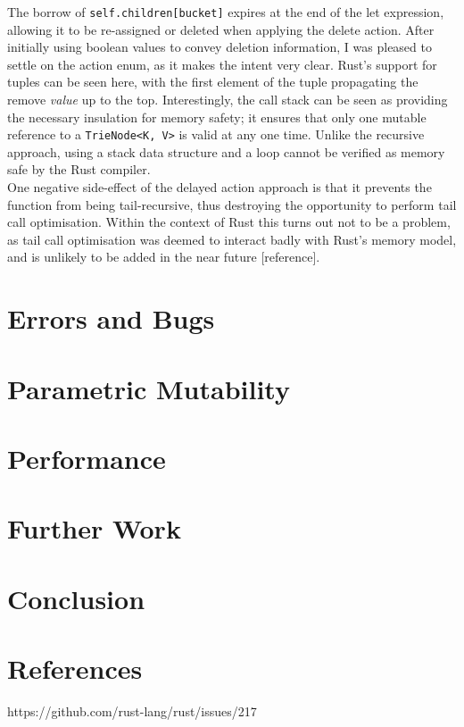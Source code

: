 \documentclass[a4paper,12pt]{article}
\newcommand{\code}{\texttt}
\begin{document}
The borrow of \code{self.children[bucket]} expires at the end of the let expression, allowing it to be re-assigned or deleted when applying the delete action. After initially using boolean values to convey deletion information, I was pleased to settle on the action enum, as it makes the intent very clear. Rust's support for tuples can be seen here, with the first element of the tuple propagating the remove \textit{value} up to the top. Interestingly, the call stack can be seen as providing the necessary insulation for memory safety; it ensures that only one mutable reference to a \code{TrieNode<K, V>} is valid at any one time. Unlike the recursive approach, using a stack data structure and a loop cannot be verified as memory safe by the Rust compiler.\\

One negative side-effect of the delayed action approach is that it prevents the function from being tail-recursive, thus destroying the opportunity to perform tail call optimisation. Within the context of Rust this turns out not to be a problem, as tail call optimisation was deemed to interact badly with Rust's memory model, and is unlikely to be added in the near future [reference].

\section{Errors and Bugs}

\section{Parametric Mutability}

\section{Performance}

\section{Further Work}

\section{Conclusion}

\section{References}

https://github.com/rust-lang/rust/issues/217
\end{document}
